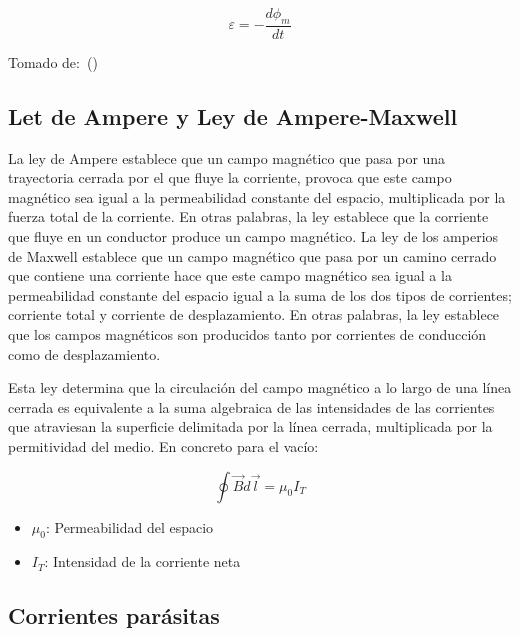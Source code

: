 \documentclass[twocolumn, 12pt]{article}
\begin{document}
	{\Large
		\begin{equation}
			\varepsilon = - \frac{d\phi_m}{dt}
		\end{equation}
	}

Tomado de:~(\cite{FaradayLawKhanAcademy})

\subsection*{Let de Ampere y Ley de Ampere-Maxwell}

La ley de Ampere establece que un campo magnético que pasa
por una trayectoria cerrada por el que fluye la corriente,
provoca que este campo magnético sea igual a la
permeabilidad constante del espacio, multiplicada por la
fuerza total de la corriente. En otras palabras, la ley
establece que la corriente que fluye en un conductor
produce un campo magnético. La ley de los amperios de
Maxwell establece que un campo magnético que pasa por un
camino cerrado que contiene una corriente hace que este
campo magnético sea igual a la permeabilidad constante del
espacio igual a la suma de los dos tipos de corrientes;
corriente total y corriente de desplazamiento. En otras
palabras, la ley establece que los campos magnéticos son
producidos tanto por corrientes de conducción como de
desplazamiento.

Esta ley determina que la circulación del campo magnético a
lo largo de una línea cerrada es equivalente a la suma
algebraica de las intensidades de las corrientes que
atraviesan la superficie delimitada por la línea cerrada,
multiplicada por la permitividad del medio. En concreto
para el vacío:

{\Large
\begin{equation}
	\oint \vec{B} d \vec{l} = \mu_{\scriptscriptstyle 0} I_{\scriptscriptstyle T}
\end{equation}
}

\begin{itemize}[label=$\triangleright$]
	\item {\Large $\mu_0$}: Permeabilidad del espacio
	\item {\Large $I_T$}: Intensidad de la corriente neta
\end{itemize}

\nocite{FenomenosElectromagneticos}

\subsection*{Corrientes parásitas}
\end{document}
